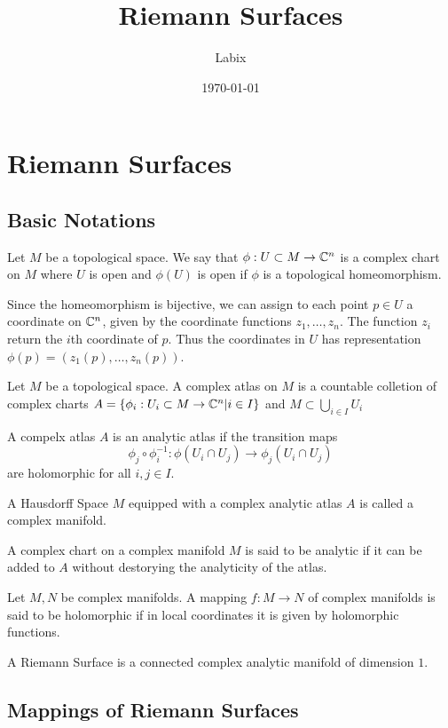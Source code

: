 \documentclass[a4paper]{article}
\title{Riemann Surfaces}
\author{Labix}
\date{\today}
\begin{document}
\maketitle
\begin{abstract}
\end{abstract}
\pagebreak
\tableofcontents
\pagebreak

\section{Riemann Surfaces}
\subsection{Basic Notations}
\begin{defn} Let $M$ be a topological space. We say that $\phi:U\subset M\to\mathbb{C}^n$ is a complex chart on $M$ where $U$ is open and $\phi(U)$ is open if $\phi$ is a topological homeomorphism. 
\end{defn}
Since the homeomorphism is bijective, we can assign to each point $p\in U$ a coordinate on $\mathbb{C}^n$, given by the coordinate functions $z_1,\dots,z_n$. The function $z_i$ return the $i$th coordinate of $p$. Thus the coordinates in $U$ has representation $\phi(p)=(z_1(p),\dots,z_n(p))$. 
\begin{defn} Let $M$ be a topological space. A complex atlas on $M$ is a countable colletion of complex charts $A=\{\phi_i:U_i\subset M\to\mathbb{C}^n|i\in I\}$ and $M\subset\bigcup_{i\in I}U_i$
\end{defn}

\begin{defn} A compelx atlas $A$ is an analytic atlas if the transition maps $$\phi_j\circ\phi_i^{-1}:\phi(U_i\cap U_j)\to\phi_j(U_i\cap U_j)$$ are holomorphic for all $i,j\in I$. 
\end{defn}

\begin{defn} A Hausdorff Space $M$ equipped with a complex analytic atlas $A$ is called a complex manifold. 
\end{defn}

\begin{defn} A complex chart on a complex manifold $M$ is said to be analytic if it can be added to $A$ without destorying the analyticity of the atlas. 
\end{defn}

\begin{defn} Let $M,N$ be complex manifolds. A mapping $f:M\to N$ of complex manifolds is said to be holomorphic if in local coordinates it is given by holomorphic functions. 
\end{defn}

\begin{defn} A Riemann Surface is a connected complex analytic manifold of dimension $1$. 
\end{defn}

\subsection{Mappings of Riemann Surfaces}
\end{document}
